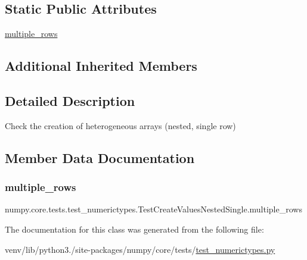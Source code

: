 \subsection*{Static Public Attributes}
\begin{DoxyCompactItemize}
\item 
\hyperlink{classnumpy_1_1core_1_1tests_1_1test__numerictypes_1_1TestCreateValuesNestedSingle_a6b50f27d354dbcbc58627a10573fba06}{multiple\+\_\+rows}
\end{DoxyCompactItemize}
\subsection*{Additional Inherited Members}


\subsection{Detailed Description}
\begin{DoxyVerb}Check the creation of heterogeneous arrays (nested, single row)\end{DoxyVerb}
 

\subsection{Member Data Documentation}
\mbox{\label{classnumpy_1_1core_1_1tests_1_1test__numerictypes_1_1TestCreateValuesNestedSingle_a6b50f27d354dbcbc58627a10573fba06}} 
\subsubsection{\texorpdfstring{multiple\+\_\+rows}{multiple\_rows}}
{\footnotesize\ttfamily numpy.\+core.\+tests.\+test\+\_\+numerictypes.\+Test\+Create\+Values\+Nested\+Single.\+multiple\+\_\+rows\hspace{0.3cm}{\ttfamily [static]}}



The documentation for this class was generated from the following file\+:\begin{DoxyCompactItemize}
\item 
venv/lib/python3./site-\/packages/numpy/core/tests/\hyperlink{test__numerictypes_8py}{test\+\_\+numerictypes.\+py}\end{DoxyCompactItemize}
